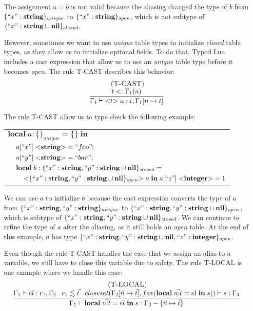 The assignment $a = b$ is not valid because the aliasing changed the
type of $b$ from $\{``x":\mathbf{string}\}_{unique}$ to $\{``x":\mathbf{string}\}_{open}$,
which is not subtype of $\{``x":\mathbf{string} \cup \mathbf{nil}\}_{closed}$.

However, sometimes we want to use \emph{unique} table types to initialize
\emph{closed} table types, as they allow us to initialize optional fields.
To do that, Typed Lua includes a cast expression that allow us
to use an \emph{unique} table type before it becomes \emph{open}.
The rule \textsc{T-CAST} describes this behavior:
\[
\begin{array}{c}
\; (\textsc{T-CAST})\\
\dfrac{t <: \Gamma_{1}(n)}
      {\Gamma_{1} \vdash {<}t{>} \; n:t, \Gamma_{1}[n \mapsto t]}
\end{array}
\]

The rule \textsc{T-CAST} allow us to type check the following example:
\begin{center}
\begin{tabular}{lll}
\multicolumn{3}{l}{$\mathbf{local} \; a:\{\}_{unique} = \{ \} \; \mathbf{in}$}\\
& \multicolumn{2}{l}{$a[``x"] \; {<}\mathbf{string}{>} = ``foo";$}\\
& \multicolumn{2}{l}{$a[``y"] \; {<}\mathbf{string}{>} = ``bar";$}\\
& \multicolumn{2}{l}{$\mathbf{local} \; b:\{``x":\mathbf{string}, ``y":\mathbf{string} \cup \mathbf{nil} \}_{closed} =$}\\
& & \multicolumn{1}{l}{${<}\{``x":\mathbf{string}, ``y":\mathbf{string} \cup \mathbf{nil}\}_{open}{>} \; a \; \mathbf{in} \; a[``z"] \; {<}\mathbf{integer}{>} = 1$}
\end{tabular}
\end{center}

We can use $a$ to initialize $b$ because the cast expression converts
the type of $a$ from $\{``x":\mathbf{string}, ``y":\mathbf{string}\}_{unique}$ to
$\{``x":\mathbf{string}, ``y":\mathbf{string} \cup \mathbf{nil}\}_{open}$, which is subtype of
$\{``x":\mathbf{string}, ``y":\mathbf{string} \cup \mathbf{nil}\}_{closed}$.
We can continue to refine the type of $a$ after the aliasing,
as it still holds an \emph{open} table.
At the end of this example, $a$ has type
$\{``x":\mathbf{string}, ``y":\mathbf{string} \cup \mathbf{nil}, ``z":\mathbf{integer}\}_{open}$.

Even though the rule \textsc{T-CAST} handles the case that we assign
an alias to a variable, we still have to close this variable due to
safety.
The rule \textsc{T-LOCAL} is one example where we handle this case:
\[
\begin{array}{c}
\; (\textsc{T-LOCAL})\\
\dfrac{\Gamma_{1} \vdash el:r_{1}, \Gamma_{2} \;\;\;
       r_{1} \lesssim \vec{t} \;\;\;
       closeset(\Gamma_{2}[\vec{n} \mapsto \vec{t}], fav(\mathbf{local} \; \vec{n{:}t} = el \; \mathbf{in} \; s)) \vdash s:\Gamma_{3}}
      {\Gamma_{1} \vdash \mathbf{local} \; \vec{n{:}t} = el \; \mathbf{in} \; s:\Gamma_{3} - \{\vec{n} \mapsto \vec{t}\}}
\end{array}
\]

